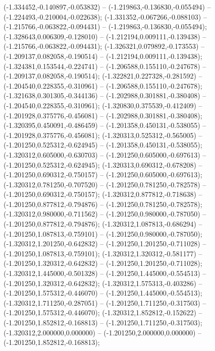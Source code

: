  (-1.334452,-0.140897,-0.053832) -- (-1.219863,-0.136830,-0.055494) -- (-1.224493,-0.210004,-0.022638);
 (-1.331352,-0.067266,-0.088103) -- (-1.215766,-0.063822,-0.094431) -- (-1.219863,-0.136830,-0.055494);
 (-1.328643,0.006309,-0.128010) -- (-1.212194,0.009111,-0.139438) -- (-1.215766,-0.063822,-0.094431);
 (-1.326321,0.079892,-0.173553) -- (-1.209137,0.082058,-0.190514) -- (-1.212194,0.009111,-0.139438);
 (-1.324381,0.153544,-0.224741) -- (-1.206588,0.155110,-0.247678) -- (-1.209137,0.082058,-0.190514);
 (-1.322821,0.227328,-0.281592) -- (-1.204540,0.228355,-0.310961) -- (-1.206588,0.155110,-0.247678);
 (-1.321638,0.301305,-0.344136) -- (-1.202988,0.301881,-0.380408) -- (-1.204540,0.228355,-0.310961);
 (-1.320830,0.375539,-0.412409) -- (-1.201928,0.375776,-0.456081) -- (-1.202988,0.301881,-0.380408);
 (-1.320395,0.450091,-0.486459) -- (-1.201358,0.450131,-0.538055) -- (-1.201928,0.375776,-0.456081);
 (-1.320313,0.525312,-0.565005) -- (-1.201250,0.525312,-0.624945) -- (-1.201358,0.450131,-0.538055);
 (-1.320312,0.605000,-0.630703) -- (-1.201250,0.605000,-0.697613) -- (-1.201250,0.525312,-0.624945);
 (-1.320313,0.690312,-0.678208) -- (-1.201250,0.690312,-0.750157) -- (-1.201250,0.605000,-0.697613);
 (-1.320312,0.781250,-0.707520) -- (-1.201250,0.781250,-0.782578) -- (-1.201250,0.690312,-0.750157);
 (-1.320312,0.877812,-0.718638) -- (-1.201250,0.877812,-0.794876) -- (-1.201250,0.781250,-0.782578);
 (-1.320312,0.980000,-0.711562) -- (-1.201250,0.980000,-0.787050) -- (-1.201250,0.877812,-0.794876);
 (-1.320312,1.087813,-0.686294) -- (-1.201250,1.087813,-0.759101) -- (-1.201250,0.980000,-0.787050);
 (-1.320312,1.201250,-0.642832) -- (-1.201250,1.201250,-0.711028) -- (-1.201250,1.087813,-0.759101);
 (-1.320312,1.320312,-0.581177) -- (-1.201250,1.320312,-0.642832) -- (-1.201250,1.201250,-0.711028);
 (-1.320312,1.445000,-0.501328) -- (-1.201250,1.445000,-0.554513) -- (-1.201250,1.320312,-0.642832);
 (-1.320312,1.575313,-0.403286) -- (-1.201250,1.575312,-0.446070) -- (-1.201250,1.445000,-0.554513);
 (-1.320312,1.711250,-0.287051) -- (-1.201250,1.711250,-0.317503) -- (-1.201250,1.575312,-0.446070);
 (-1.320312,1.852812,-0.152622) -- (-1.201250,1.852812,-0.168813) -- (-1.201250,1.711250,-0.317503);
 (-1.320312,2.000000,0.000000) -- (-1.201250,2.000000,0.000000) -- (-1.201250,1.852812,-0.168813);
